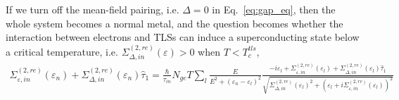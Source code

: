 \documentclass[]{article}
\begin{document}
If we turn off the mean-field pairing, i.e. $\Delta = 0$ in Eq.~\eqref{eq:gap_eq}, then the whole system
becomes a normal metal, and the question becomes whether the interaction between electrons and TLSs
can induce a superconducting state below a critical temperature,
i.e. $\Sigma_{\Delta,in}^{(2,re)}(\varepsilon) > 0$ when $T < T_c^{tls}$,
\begin{align}
    \Sigma_{\varepsilon,in}^{(2,re)}(\varepsilon_n) + \Sigma_{\Delta,in}^{(2,re)}(\varepsilon_n)\widehat{\tau}_1
    = \frac{\hbar}{\tau_{in}}N_{ge}T\sum_l\frac{E}{E^2+(\varepsilon_n-\varepsilon_l)^2}
    \frac{-i\varepsilon_l + \Sigma_{\varepsilon,in}^{(2,re)}(\varepsilon_l)
     + \Sigma_{\Delta,in}^{(2,re)}(\varepsilon_l)\widehat{\tau}_1}
     {\sqrt{\Sigma_{\Delta,in}^{(2,re)}(\varepsilon_l)^2 
     + \left(\varepsilon_l+i\Sigma_{\varepsilon,in}^{(2,re)}(\varepsilon_l)\right)^2}}
\end{align}
\end{document}
